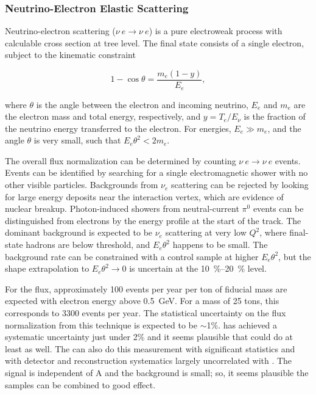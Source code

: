 \subsubsection{Neutrino-Electron Elastic Scattering}
\label{ssec:fluxintro-e-nu-scatt}



Neutrino-electron scattering ($\nu \ e \rightarrow \nu \ e$) is a pure electroweak process with calculable cross section at tree level. The final state consists of a single electron, subject to the kinematic constraint 

\begin{equation}
1 - \cos \theta = \frac{m_{e}(1-y)}{E_{e}},
\end{equation}

where $\theta$ is the angle between the electron and incoming neutrino, $E_{e}$ and $m_{e}$ are the electron mass and total energy, respectively, and $y = T_{e}/E_{\nu}$ is the fraction of the neutrino energy transferred to the electron. For  energies, $E_{e} \gg m_{e}$, and the angle $\theta$ is very small, such that $E_{e}\theta^{2} < 2m_{e}$. 

The overall flux normalization can be determined by counting $\nu \ e \rightarrow \nu \ e$ events. Events can be identified by searching for a single electromagnetic shower with no other visible particles. Backgrounds from $\nu_{e}$  scattering can be rejected by looking for large energy deposits near the interaction vertex, which are evidence of nuclear breakup. Photon-induced showers from neutral-current $\pi^{0}$ events can be distinguished from electrons by the energy profile at the start of the track. The dominant background is expected to be $\nu_{e}$  scattering at very low $Q^{2}$, where final-state hadrons are below threshold, and $E_{e}\theta^{2}$ happens to be small. The background rate can be constrained with a control sample at higher $E_{e}\theta^{2}$, but the shape extrapolation to $E_{e}\theta^{2} \rightarrow 0$ is uncertain at the \SIrange{10}{20}{\%} level.

For the  flux, approximately \num{100} events per year per ton of fiducial mass are expected with electron energy above \SI{0.5}{GeV}. For a  mass of 25 tons, this corresponds to \num{3300} events per year. The statistical uncertainty on the flux normalization from this technique is expected to be $\sim$1\%.  has achieved a systematic uncertainty just under 2\% and it seems plausible that \dune could do at least as well\cite{bib:minervanue}. The  can also do this measurement with significant statistics and with detector and reconstruction systematics largely uncorrelated with .  The signal is independent of A and the background is small; so, it seems plausible the samples can be combined to good effect.



